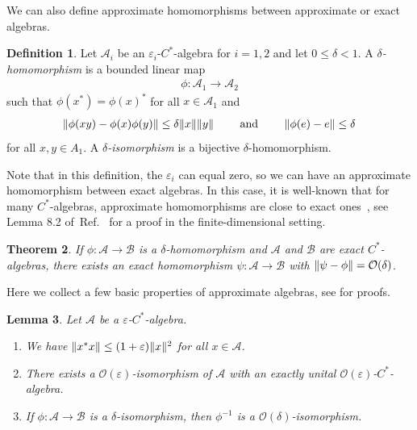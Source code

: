\documentclass[11pt,reqno]{amsart}
\newtheorem{theorem}{Theorem}[section]
\newtheorem{lemma}[theorem]{Lemma}
\theoremstyle{definition}
\newtheorem{definition}[theorem]{Definition}
\theoremstyle{remark}
\numberwithin{equation}{section}
\newcommand{\eps}{\varepsilon}
\newcommand{\cA}{\mathcal A}
\newcommand{\cB}{\mathcal B}
\newcommand{\bigO}{\mathcal O}
\DeclarePairedDelimiter\norm{\lVert}{\rVert}
\begin{document}
We can also define approximate homomorphisms between approximate or exact algebras.

\begin{definition}\label{dfn:approx homomorphism}
    Let $\cA_i$ be an $\eps_i$-$C^*$-algebra for $i = 1,2$ and let $0 \leq \delta  < 1$. A \emph{$\delta$-homomorphism} is a bounded linear map
    \begin{align*}
        \phi : \cA_1 \to \cA_2
    \end{align*}
    such that $\phi(x^*) = \phi(x)^*$ for all $x \in \cA_1$ and
    \begin{align*}
        \norm{\phi(xy) - \phi(x)\phi(y)} \leq \delta \norm{x}\norm{y} \qquad \text{ and } \qquad \norm{\phi(e) - e} \leq \delta
    \end{align*}
    for all $x,y \in A_1$.
    A \emph{$\delta$-isomorphism} is a bijective $\delta$-homomorphism.
\end{definition}
Note that in this definition, the $\eps_i$ can equal zero, so we can have an approximate homomorphism between exact algebras.
In this case, it is well-known that for many $C^*$-algebras, approximate homomorphisms are close to exact ones~\cite{johnson1988approximately}, see
Lemma 8.2 of~Ref.~\cite{kitaev2024almost} for a proof in the finite-dimensional setting.

\begin{theorem}\label{thm:make homomorphism exact}
    If $\phi : \cA \to \cB$ is a $\delta$-homomorphism and $\cA$ and $\cB$ are exact $C^*$-algebras, there exists an exact homomorphism $\psi : \cA \to \cB$ with $\norm{\psi - \phi} = \bigO(\delta)$.
\end{theorem}

Here we collect a few basic properties of approximate algebras, see \cite{kitaev2024almost} for proofs.

\begin{lemma}
    Let $\cA$ be a $\eps$-$C^*$-algebra.
    \begin{enumerate}
        \item We have $\norm{x^*x} \leq (1 + \eps)\norm{x}^2$ for all $x \in \cA$.
              \item\label{it:nearby exact unit} There exists a $\bigO(\eps)$-isomorphism of $\cA$ with an exactly unital $\bigO(\eps)$-$C^*$-algebra.
        \item If $\phi : \cA \to \cB$ is a $\delta$-isomorphism, then $\phi^{-1}$ is a $\bigO(\delta)$-isomorphism.
    \end{enumerate}
\end{lemma}
\end{document}
